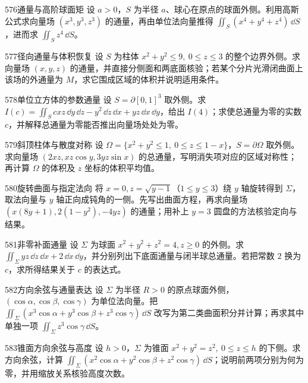 \begin{exercise}{576}{通量与高阶球面矩}
设 $a>0$，$S$ 为半径 $a$、球心在原点的球面外侧。利用高斯公式求向量场 $(x^3,y^3,z^3)$ 的通量，再由单位法向量推得 $\iint_S(x^4+y^4+z^4)\,\dd S$，进而求 $\iint_Sz^4\,\dd S$。
\end{exercise}
\begin{exercise}{577}{径向通量与体积恢复}
设 $S$ 为柱体 $x^2+y^2\le9,\ 0\le z\le3$ 的整个边界外侧。求向量场 $(x,y,z)$ 的通量，并直接分侧面和两底面核验；若某个分片光滑闭曲面上该场的外通量为 $M$，求它围成区域的体积并说明适用条件。
\end{exercise}
\begin{exercise}{578}{单位立方体的参数通量}
设 $S=\partial[0,1]^3$ 取外侧。求 $I(c)=\iint_Scxz\,\dd y\,\dd z-y^2\,\dd z\,\dd x+yz\,\dd x\,\dd y$，给出 $I(4)$；求使总通量为零的实数 $c$，并解释总通量为零能否推出向量场处处为零。
\end{exercise}
\begin{exercise}{579}{斜顶柱体与散度对称}
设 $\Omega=\{x^2+y^2\le1,\ 0\le z\le1-x\}$，$S=\partial\Omega$ 取外侧。求向量场 $(2xz,xz\cos y,3yz\sin x)$ 的总通量，写明消失项对应的区域对称性；再计算 $\Omega$ 的体积及 $z$ 坐标的体积平均值。
\end{exercise}
\begin{exercise}{580}{旋转曲面与指定法向}
将 $x=0,z=\sqrt{y-1}$（$1\le y\le3$）绕 $y$ 轴旋转得到 $\Sigma$，取法向量与 $y$ 轴正向成钝角的一侧。先写出曲面方程，再求向量场 $(x(8y+1),2(1-y^2),-4yz)$ 的通量；用补上 $y=3$ 圆盘的方法核验定向与结果。
\end{exercise}
\begin{exercise}{581}{非零补面通量}
设 $\Sigma$ 为球面 $x^2+y^2+z^2=4,z\ge0$ 的外侧。求 $\iint_{\Sigma}yz\,\dd z\,\dd x+2\,\dd x\,\dd y$，并分别列出下底面通量与闭半球总通量。若把常数 $2$ 换为 $c$，求所得结果关于 $c$ 的表达式。
\end{exercise}
\begin{exercise}{582}{方向余弦与通量表达}
设 $\Sigma$ 为半径 $R>0$ 的原点球面外侧，$(\cos\alpha,\cos\beta,\cos\gamma)$ 为单位法向量。把 $\iint_{\Sigma}(x^3\cos\alpha+y^3\cos\beta+z^3\cos\gamma)\,\dd S$ 改写为第二类曲面积分并计算；再求其中单独一项 $\iint_{\Sigma}z^3\cos\gamma\,\dd S$。
\end{exercise}
\begin{exercise}{583}{锥面方向余弦与高度}
设 $h>0$，$\Sigma$ 为锥面 $x^2+y^2=z^2,\ 0\le z\le h$ 的下侧。求方向余弦，计算 $\iint_{\Sigma}(x^2\cos\alpha+y^2\cos\beta+z^2\cos\gamma)\,\dd S$；说明前两项分别为何为零，并用缩放关系核验高度次数。
\end{exercise}
